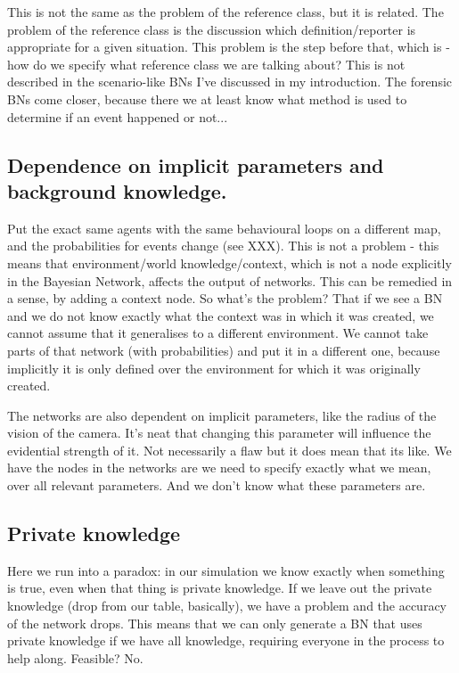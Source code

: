 This is not the same as the problem of the reference class, but it is related. The problem of the reference class is the discussion which definition/reporter is appropriate for a given situation. This problem is the step before that, which is - how do we specify what reference class we are talking about? This is not described in the scenario-like BNs I've discussed in my introduction. The forensic BNs come closer, because there we at least know what method is used to determine if an event happened or not...

\subsection{Dependence on implicit parameters and background knowledge.}

Put the exact same agents with the same behavioural loops on a different map, and the probabilities for events change (see XXX). This is not a problem - this means that environment/world knowledge/context, which is not a node explicitly in the Bayesian Network, affects the output of networks. This can be remedied in a sense, by adding a context node. So what's the problem? That if we see a BN and we do not know exactly what the context was in which it was created, we cannot assume that it generalises to a different environment. We cannot take parts of that network (with probabilities) and put it in a different one, because implicitly it is only defined over the environment for which it was originally created.

The networks are also dependent on implicit parameters, like the radius of the vision of the camera. It's neat that changing this parameter will influence the evidential strength of it. Not necessarily a flaw but it does mean that its like. We have the nodes in the networks are we need to specify exactly what we mean, over all relevant parameters. And we don't know what these parameters are.

\subsection{Private knowledge}

Here we run into a paradox: in our simulation we know exactly when something is true, even when that thing is private knowledge. If we leave out the private knowledge (drop from our table, basically), we have a problem and the accuracy of the network drops. This means that we can only generate a BN that uses private knowledge if we have all knowledge, requiring everyone in the process to help along. Feasible? No.

